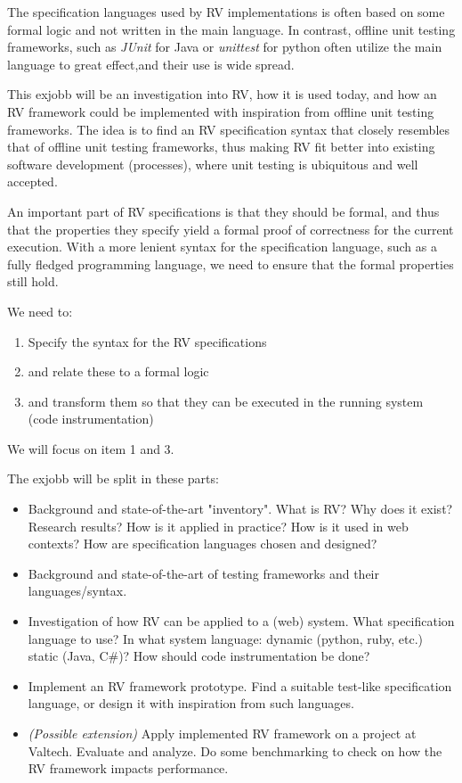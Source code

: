 \documentclass[a4paper,11pt]{kth-mag}
\begin{document}
The specification languages used by RV implementations is often based
on some formal logic and not written in the main language. In contrast,
offline unit testing frameworks, such as \textit{JUnit} for Java or \textit{unittest} for python
often utilize the main language to great effect,and their use is wide spread.

This exjobb will be an investigation into RV, how it is used today, and how an
RV framework could be implemented with inspiration from offline unit testing
frameworks. The idea is to find an RV specification syntax that closely
resembles that of offline unit testing frameworks, thus making RV fit better into
existing software development (processes), where unit testing is ubiquitous
and well accepted.

An important part of RV specifications is that they should be formal, and thus
that the properties they specify yield a formal proof of correctness for the
current execution. With a more lenient syntax for the specification language, such as
a fully fledged programming language, we need to ensure that the formal properties
still hold.

We need to:

\begin{enumerate}
	\item Specify the syntax for the RV specifications
	\item and relate these to a formal logic
	\item and transform them so that they can be executed in the running system
		(code instrumentation)
\end{enumerate}

We will focus on item 1 and 3.

The exjobb will be split in these parts:

\begin{itemize}
	\item Background and state-of-the-art "inventory". What is RV? Why does it
        exist? Research results? How is it applied in practice? How is it used
        in web contexts? How are specification languages chosen and designed?
	\item Background and state-of-the-art of testing frameworks and their
        languages/syntax.
	\item Investigation of how RV can be applied to a (web) system. What
        specification language to use? In what system language: dynamic
        (python, ruby, etc.) static (Java, C\#)? How should code
        instrumentation be done?
	\item Implement an RV framework prototype. Find a suitable test-like
        specification language, or design it with inspiration from such
        languages.
	\item \textit{(Possible extension)}
		Apply implemented RV framework on a project at Valtech. Evaluate and
        analyze. Do some benchmarking to check on how the RV framework impacts
        performance.
\end{itemize}
\end{document}
